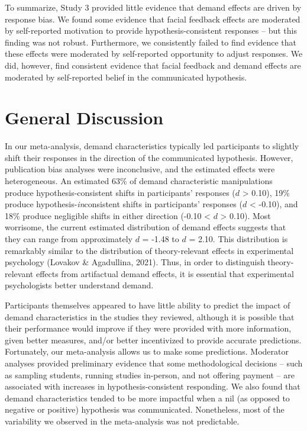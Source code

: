 \documentclass[
  man,floatsintext]{apa6}
\begin{document}
To summarize, Study 3 provided little evidence that demand effects are driven by response bias. We found some evidence that facial feedback effects are moderated by self-reported motivation to provide hypothesis-consistent responses -- but this finding was not robust. Furthermore, we consistently failed to find evidence that these effects were moderated by self-reported opportunity to adjust responses. We did, however, find consistent evidence that facial feedback and demand effects are moderated by self-reported belief in the communicated hypothesis.

\hypertarget{general-discussion}{%
\section{General Discussion}\label{general-discussion}}

In our meta-analysis, demand characteristics typically led participants to slightly shift their responses in the direction of the communicated hypothesis. However, publication bias analyses were inconclusive, and the estimated effects were heterogeneous. An estimated 63\% of demand characteristic manipulations produce hypothesis-consistent shifts in participants' responses (\(d\) \textgreater{} 0.10), 19\% produce hypothesis-\emph{in}consistent shifts in participants' responses (\(d\) \textless{} -0.10), and 18\% produce negligible shifts in either direction (-0.10 \textless{} \(d\) \textgreater{} 0.10). Most worrisome, the current estimated distribution of demand effects suggests that they can range from approximately \(d\) = -1.48 to \(d\) = 2.10. This distribution is remarkably similar to the distribution of theory-relevant effects in experimental psychology (Lovakov \& Agadullina, 2021). Thus, in order to distinguish theory-relevant effects from artifactual demand effects, it is essential that experimental psychologists better understand demand.

Participants themselves appeared to have little ability to predict the impact of demand characteristics in the studies they reviewed, although it is possible that their performance would improve if they were provided with more information, given better measures, and/or better incentivized to provide accurate predictions. Fortunately, our meta-analysis allows us to make some predictions. Moderator analyses provided preliminary evidence that some methodological decisions -- such as sampling students, running studies in-person, and not offering payment -- are associated with increases in hypothesis-consistent responding. We also found that demand characteristics tended to be more impactful when a nil (as opposed to negative or positive) hypothesis was communicated. Nonetheless, most of the variability we observed in the meta-analysis was not predictable.
\end{document}
